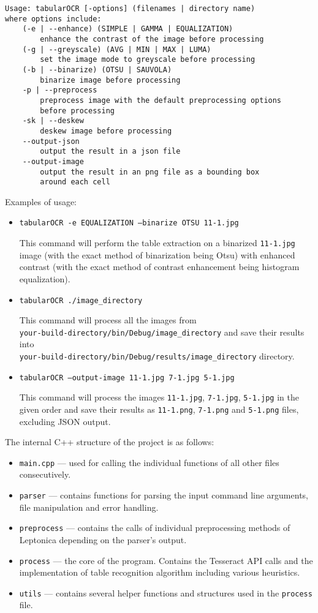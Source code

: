 \begin{verbatim}
Usage: tabularOCR [-options] (filenames | directory name)
where options include:
    (-e | --enhance) (SIMPLE | GAMMA | EQUALIZATION)
        enhance the contrast of the image before processing
    (-g | --greyscale) (AVG | MIN | MAX | LUMA)
        set the image mode to greyscale before processing
    (-b | --binarize) (OTSU | SAUVOLA)
        binarize image before processing
    -p | --preprocess
        preprocess image with the default preprocessing options
        before processing
    -sk | --deskew
        deskew image before processing
    --output-json
        output the result in a json file
    --output-image
        output the result in an png file as a bounding box
        around each cell
\end{verbatim}
Examples of usage: 
\begin{itemize}
    \item \texttt{tabularOCR -e EQUALIZATION --binarize OTSU 11-1.jpg}
    
    This command will perform the table extraction on a binarized \texttt{11-1.jpg} image (with the exact method of binarization being Otsu) with enhanced contrast (with the exact method of contrast enhancement being histogram equalization).
    
    \item \texttt{tabularOCR ./image\_directory}
    
    This command will process all the images from\\
    \texttt{your-build-directory/bin/Debug/image\_directory}
    and save their results into\\
    \texttt{your-build-directory/bin/Debug/results/image\_directory} directory.
    
    \item \texttt{tabularOCR --output-image 11-1.jpg 7-1.jpg 5-1.jpg}
    
    This command will process the images \texttt{11-1.jpg}, \texttt{7-1.jpg}, \texttt{5-1.jpg} in the given order and save their results as \texttt{11-1.png}, \texttt{7-1.png} and \texttt{5-1.png} files, excluding JSON output.
    
\end{itemize}
    
The internal C++ structure of the project is as follows:
\begin{itemize}
    \item \texttt{main.cpp} --- used for calling the individual functions of all other files consecutively.
    \item \texttt{parser} --- contains functions for parsing the input command line arguments, file manipulation and error handling.
    \item \texttt{preprocess} --- contains the calls of individual preprocessing methods of Leptonica depending on the parser's output.
    \item \texttt{process} --- the core of the program. Contains the Tesseract API calls and the implementation of table recognition algorithm including various heuristics.
    \item \texttt{utils} --- contains several helper functions and structures used in the \texttt{process} file.
\end{itemize}